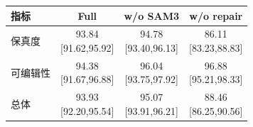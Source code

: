 \begin{tabular}{lccc}\toprule
指标 & Full & w/o SAM3 & w/o repair \\ \midrule
保真度 & \shortstack{93.84\\{}[91.62,95.92]} & \shortstack{94.78\\{}[93.40,96.13]} & \shortstack{86.11\\{}[83.23,88.83]} \\
可编辑性 & \shortstack{94.38\\{}[91.67,96.88]} & \shortstack{96.04\\{}[93.75,97.92]} & \shortstack{96.88\\{}[95.21,98.33]} \\
总体 & \shortstack{93.93\\{}[92.20,95.54]} & \shortstack{95.07\\{}[93.91,96.21]} & \shortstack{88.46\\{}[86.25,90.56]} \\
\bottomrule\end{tabular}